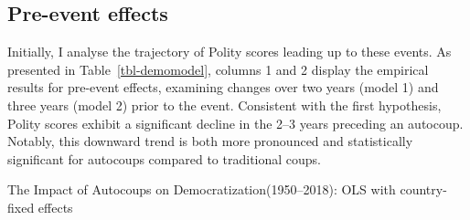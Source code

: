 \documentclass[
  12pt,
]{report}
\begin{document}
\subsection{Pre-event effects}\label{pre-event-effects}

Initially, I analyse the trajectory of Polity scores leading up to these
events. As presented in Table~\ref{tbl-demomodel}, columns 1 and 2
display the empirical results for pre-event effects, examining changes
over two years (model 1) and three years (model 2) prior to the event.
Consistent with the first hypothesis, Polity scores exhibit a
significant decline in the 2--3 years preceding an autocoup. Notably,
this downward trend is both more pronounced and statistically
significant for autocoups compared to traditional coups.

\begin{table}

\caption{\label{tbl-demomodel}The Impact of Autocoups on
Democratization(1950--2018): OLS with country-fixed effects}

\centering{

}
\end{table}
\end{document}
